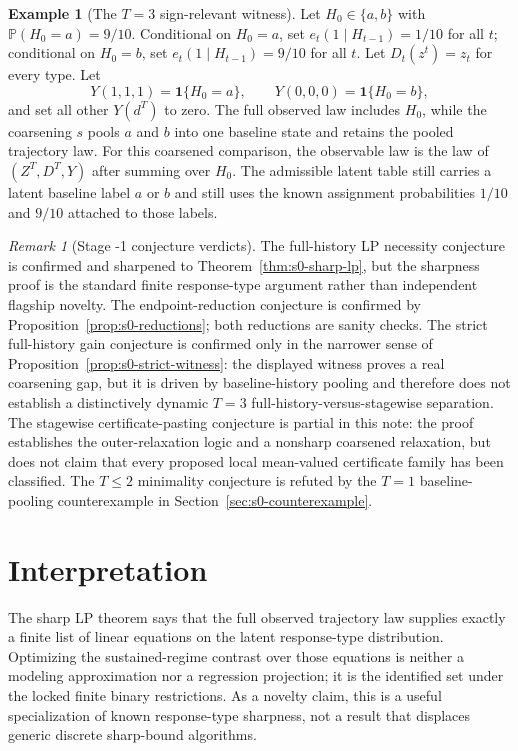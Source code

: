 \documentclass[11pt]{article}
\renewcommand{\Pr}{\mathbb{P}}
\newcommand{\one}{\mathbf{1}}
\theoremstyle{definition}
\newtheorem{example}{Example}
\theoremstyle{plain}
\theoremstyle{remark}
\newtheorem{remark}{Remark}
\begin{document}
\begin{example}[The \(T=3\) sign-relevant witness]\label{ex:s0-t3-witness}
Let \(H_0\in\{a,b\}\) with \(\Pr(H_0=a)=9/10\).  Conditional on \(H_0=a\), set \(e_t(1\mid H_{t-1})=1/10\) for all \(t\); conditional on \(H_0=b\), set \(e_t(1\mid H_{t-1})=9/10\) for all \(t\).  Let \(D_t(z^t)=z_t\) for every type.  Let
\[
Y(1,1,1)=\one\{H_0=a\},\qquad
Y(0,0,0)=\one\{H_0=b\},
\]
and set all other \(Y(d^T)\) to zero.  The full observed law includes \(H_0\), while the coarsening \(s\) pools \(a\) and \(b\) into one baseline state and retains the pooled trajectory law.
For this coarsened comparison, the observable law is the law of \((Z^T,D^T,Y)\) after summing over \(H_0\).  The admissible latent table still carries a latent baseline label \(a\) or \(b\) and still uses the known assignment probabilities \(1/10\) and \(9/10\) attached to those labels.
\end{example}

\begin{remark}[Stage -1 conjecture verdicts]\label{rem:s0-verdicts}
The full-history LP necessity conjecture is confirmed and sharpened to Theorem~\ref{thm:s0-sharp-lp}, but the sharpness proof is the standard finite response-type argument rather than independent flagship novelty.  The endpoint-reduction conjecture is confirmed by Proposition~\ref{prop:s0-reductions}; both reductions are sanity checks.  The strict full-history gain conjecture is confirmed only in the narrower sense of Proposition~\ref{prop:s0-strict-witness}: the displayed witness proves a real coarsening gap, but it is driven by baseline-history pooling and therefore does not establish a distinctively dynamic \(T=3\) full-history-versus-stagewise separation.  The stagewise certificate-pasting conjecture is partial in this note: the proof establishes the outer-relaxation logic and a nonsharp coarsened relaxation, but does not claim that every proposed local mean-valued certificate family has been classified.  The \(T\le2\) minimality conjecture is refuted by the \(T=1\) baseline-pooling counterexample in Section~\ref{sec:s0-counterexample}.
\end{remark}

\section{Interpretation}
The sharp LP theorem says that the full observed trajectory law supplies exactly a finite list of linear equations on the latent response-type distribution.  Optimizing the sustained-regime contrast over those equations is neither a modeling approximation nor a regression projection; it is the identified set under the locked finite binary restrictions.  As a novelty claim, this is a useful specialization of known response-type sharpness, not a result that displaces generic discrete sharp-bound algorithms.
\end{document}
